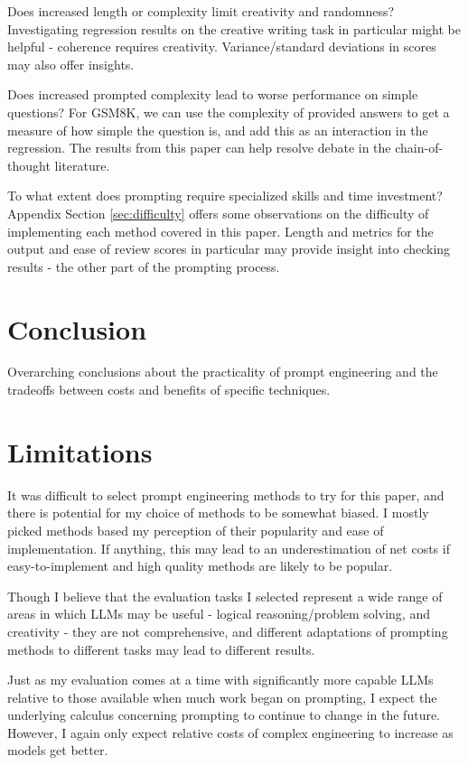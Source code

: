 \documentclass[11pt]{article}
\begin{document}
Does increased length or complexity limit creativity and randomness? Investigating regression results on the creative writing task in particular might be helpful - coherence requires creativity. Variance/standard deviations in scores may also offer insights.

Does increased prompted complexity lead to worse performance on simple questions? For GSM8K, we can use the complexity of provided answers to get a measure of how simple the question is, and add this as an interaction in the regression. The results from this paper can help resolve debate in the chain-of-thought literature. \cite{fu_complexity-based_2023, shum_automatic_2023}

To what extent does prompting require specialized skills and time investment? Appendix Section \ref{sec:difficulty} offers some observations on the difficulty of implementing each method covered in this paper. Length and metrics for the output and ease of review scores in particular may provide insight into checking results - the other part of the prompting process.

\section*{Conclusion}

Overarching conclusions about the practicality of prompt engineering and the tradeoffs between costs and benefits of specific techniques.

\section*{Limitations}

It was difficult to select prompt engineering methods to try for this paper, and there is potential for my choice of methods to be somewhat biased. I mostly picked methods based my perception of their popularity and ease of implementation. If anything, this may lead to an underestimation of net costs if easy-to-implement and high quality methods are likely to be popular. 

Though I believe that the evaluation tasks I selected represent a wide range of areas in which LLMs may be useful - logical reasoning/problem solving, and creativity - they are not comprehensive, and different adaptations of prompting methods to different tasks may lead to different results.

Just as my evaluation comes at a time with significantly more capable LLMs relative to those available when much work began on prompting, I expect the underlying calculus concerning prompting to continue to change in the future. However, I again only expect relative costs of complex engineering to increase as models get better.
\end{document}
